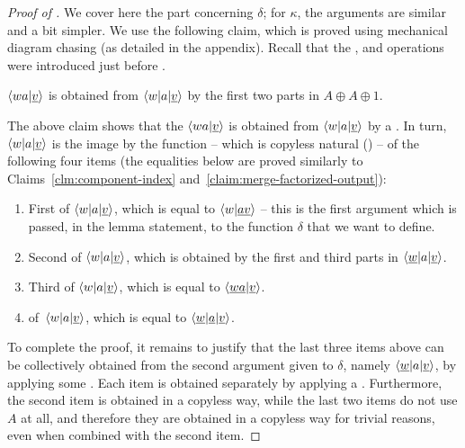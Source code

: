 \begin{proof}[Proof of ]
  We cover here the part concerning $\delta$; for $\kappa$, the arguments are
  similar and a bit simpler. We use the following claim, which is proved using
  mechanical diagram chasing (as detailed in the appendix). Recall that
  the ,  and  operations were introduced just before
  .
    \begin{claim}\label{claim:merge-factorized-output}
        $\langle wa|\underline v \rangle$ is obtained from $\langle w|a|\underline v \rangle$ by  the first two parts in $A \oplus A \oplus 1$.
    \end{claim}

    The above
    claim shows that the  $\langle wa|\underline v \rangle$ is
    obtained from $\langle w|a|\underline v \rangle$ by a .
    In turn, $\langle w|a|\underline v \rangle$ is the image by the
     function -- which is copyless natural
    () -- of the following four items (the equalities below are proved similarly to Claims~\ref{clm:component-index} and~\ref{claim:merge-factorized-output}):
     \begin{enumerate}
        \item \label{it:first-view}First  of $\langle w|a|\underline v \rangle$, which is equal to $\langle w|\underline {av} \rangle$ -- this is the first argument which is passed, in the lemma statement, to the function $\delta$ that we want to define.
        \item  \label{it:second-view} Second  of $\langle w|a|\underline v \rangle$, which is obtained by  the first and third parts in $\langle \underline w|a|\underline v \rangle$.
        \item \label{it:third-view}   Third  of $\langle w|a|\underline v \rangle$, which is equal to $\langle \underline {wa}|\underline{v} \rangle$.
        \item   \label{it:shape}  of~$\langle w|a|\underline v \rangle$, which is equal to $\langle \underline w|\underline a| \underline v \rangle$.
     \end{enumerate}

To complete the proof, it remains to justify that the last three items above can
be collectively obtained from the second argument given to $\delta$, namely $\langle \underline w|a|\underline v \rangle$, by applying some . Each item is obtained separately by applying a . Furthermore, the second item is obtained in a copyless way, while the last two items do not use $A$ at all, and therefore they are obtained in a copyless way for trivial reasons, even when combined with the second item.
\end{proof}


